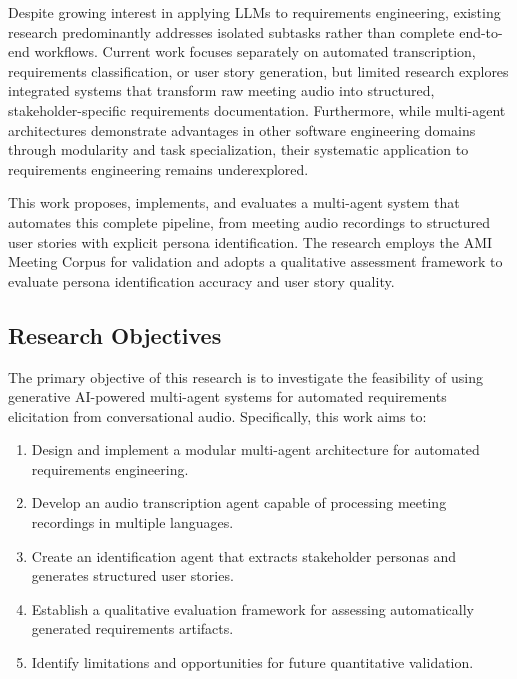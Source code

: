 \documentclass[12pt]{article}
\begin{document}
Despite growing interest in applying LLMs to requirements engineering, existing research predominantly addresses isolated subtasks rather than complete end-to-end workflows. Current work focuses separately on automated transcription, requirements classification, or user story generation, but limited research explores integrated systems that transform raw meeting audio into structured, stakeholder-specific requirements documentation. Furthermore, while multi-agent architectures demonstrate advantages in other software engineering domains through modularity and task specialization, their systematic application to requirements engineering remains underexplored.

This work proposes, implements, and evaluates a multi-agent system that automates this complete pipeline, from meeting audio recordings to structured user stories with explicit persona identification. The research employs the AMI Meeting Corpus for validation and adopts a qualitative assessment framework to evaluate persona identification accuracy and user story quality.

\subsection{Research Objectives}

The primary objective of this research is to investigate the feasibility of using generative AI-powered multi-agent systems for automated requirements elicitation from conversational audio. Specifically, this work aims to:

\begin{enumerate}
    \item Design and implement a modular multi-agent architecture for automated requirements engineering.
    
    \item Develop an audio transcription agent capable of processing meeting recordings in multiple languages.
    
    \item Create an identification agent that extracts stakeholder personas and generates structured user stories.
    
    \item Establish a qualitative evaluation framework for assessing automatically generated requirements artifacts.
    
    \item Identify limitations and opportunities for future quantitative validation.
\end{enumerate}
\end{document}
